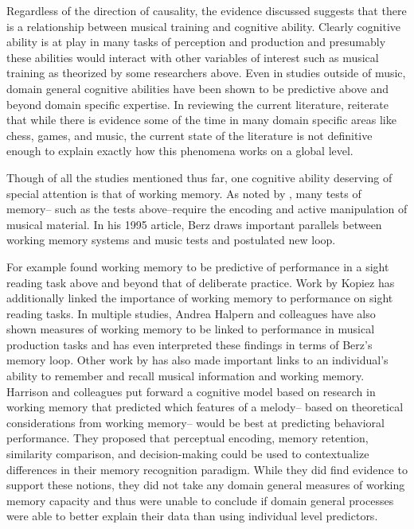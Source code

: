 \documentclass[]{book}
\begin{document}
Regardless of the direction of causality, the evidence discussed suggests that there is a relationship between musical training and cognitive ability.
Clearly cognitive ability is at play in many tasks of perception and production and presumably these abilities would interact with other variables of interest such as musical training as theorized by some researchers above.
Even in studies outside of music, domain general cognitive abilities have been shown to be predictive above and beyond domain specific expertise.
In reviewing the current literature, \citep{hambrickDomainGeneralModelsExpertise2019} reiterate that while there is evidence some of the time in many domain specific areas like chess, games, and music, the current state of the literature is not definitive enough to explain exactly how this phenomena works on a global level.

Though of all the studies mentioned thus far, one cognitive ability deserving of special attention is that of working memory.
As noted by \citep{berzWorkingMemoryMusic1995}, many tests of memory-- such as the tests above--require the encoding and active manipulation of musical material.
In his 1995 article, Berz draws important parallels between working memory systems and music tests and postulated new loop.

For example \citet{meinzDeliberatePracticeNecessary2010} found working memory to be predictive of performance in a sight reading task above and beyond that of deliberate practice.
Work by Kopiez \citep{kopiezDynamicModelSkills2006, kopiezGeneralModelSkills2008} has additionally linked the importance of working memory to performance on sight reading tasks.
In multiple studies, Andrea Halpern and colleagues have also shown measures of working memory to be linked to performance in musical production tasks \citep{halpernEffectsTimbreTempo2008, nicholsScoreOneJazz2018} and has even interpreted these findings in terms of Berz's memory loop.
Other work by \citet{harrisonModellingMelodicDiscrimination2016} has also made important links to an individual's ability to remember and recall musical information and working memory.
Harrison and colleagues put forward a cognitive model based on research in working memory that predicted which features of a melody-- based on theoretical considerations from working memory-- would be best at predicting behavioral performance.
They proposed that perceptual encoding, memory retention, similarity comparison, and decision-making could be used to contextualize differences in their memory recognition paradigm.
While they did find evidence to support these notions, they did not take any domain general measures of working memory capacity and thus were unable to conclude if domain general processes were able to better explain their data than using individual level predictors.
\end{document}
